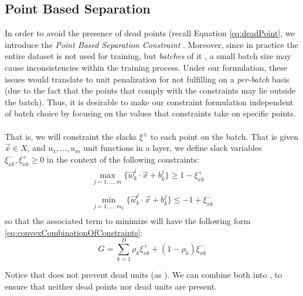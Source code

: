 \subsection{Point Based Separation \SepPoint}\label{subsec:sepPoint}

In order to avoid the presence of dead points (recall Equation \ref{eq:deadPoint}, we introduce the \emph{Point Based Separation Constraint} \SepPoint. Moreover, since in practice the entire dataset is not used for training, but \emph{batches} of it \cite{LeCun06atutorial}, a small batch size may cause inconsistencies within the training process. Under our formulation,  these issues would translate to unit penalization for not fulfilling \SepUnit on a \emph{per-batch} basis (due to the fact that the points that comply with the constraints may lie outside the batch).  Thus, it is desirable to make our constraint formulation independent of batch choice by focusing on the values that constraints take on specific points. 
\\\\
That is, we will constraint the slacks $\xi^{\pm}$ to each point on the batch. That is given $\vec{x}\in X$, and $u_1,\ldots,u_m$ unit functions in a layer, we define slack variables $\xi^{-}_{xk},\xi^{+}_{xk}\geq 0$ in the context of the following constraints:
\begin{equation}\label{eq:pointSeparationConstraint}
\begin{array}{lcl}
    \displaystyle\max_{j=1,\ldots,m}\{\vec{w}^j_k\cdot\vec{x}+b^j_k\}\geq 1-\xi^{+}_{xk}\\\\
    \displaystyle\min_{j=1,\ldots,m_k}\{\vec{w}^j_k\cdot\vec{x}+b^j_k\}\leq -1+\xi^{-}_{xk}\\
\end{array}    
\end{equation}
so that the associated term to minimize will have the following form \ref{eq:convexCombinationOfConstraints}:
\begin{equation}\label{eq:convexCombinationOfConstraints}
    G = \sum_{k=1}^{D}\rho_{k}\xi^{+}_{xk}+(1-\rho_{k})\xi^{-}_{xk}
\end{equation}

Notice that \SepPoint does not prevent  dead units (as \SepUnit). We can combine both into \SepUnitPoint, to ensure that neither dead points nor dead units are present. 